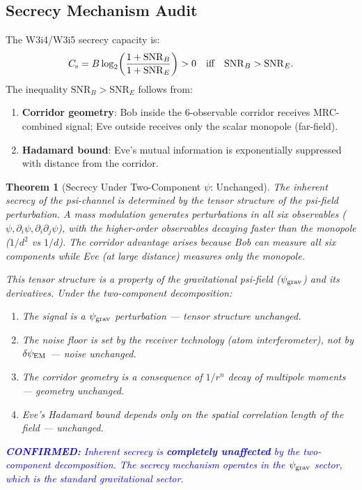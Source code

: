 \documentclass[11pt]{article}
\newtheorem{theorem}{Theorem}[section]
\theoremstyle{definition}
\theoremstyle{remark}
\newcommand{\psigrav}{\psi_{\rm grav}}
\newcommand{\dpsiEM}{\delta\psi_{\rm EM}}
\newcommand{\SNR}{\mathrm{SNR}}
\newcommand{\Cs}{C_{\rm s}}
\newcommand{\confirmed}[1]{\textcolor{blue}{\textbf{CONFIRMED:} #1}}
\begin{document}
\subsection{Secrecy Mechanism Audit}

The W3i4/W3i5 secrecy capacity is:
\begin{equation}
\Cs = B\log_2\!\left(\frac{1 + \SNR_B}{1 + \SNR_E}\right) > 0
\quad\text{iff}\quad \SNR_B > \SNR_E.
\label{eq:secrecy_capacity}
\end{equation}
The inequality $\SNR_B > \SNR_E$ follows from:
\begin{enumerate}
\item \textbf{Corridor geometry}: Bob inside the 6-observable corridor
  receives MRC-combined signal; Eve outside receives only the scalar
  monopole (far-field).
\item \textbf{Hadamard bound}: Eve's mutual information is exponentially
  suppressed with distance from the corridor.
\end{enumerate}

\begin{theorem}[Secrecy Under Two-Component $\psi$: Unchanged]
\label{thm:secrecy_unchanged}
The inherent secrecy of the psi-channel is determined by the
\emph{tensor structure} of the psi-field perturbation. A mass modulation
generates perturbations in all six observables
($\psi, \partial_i\psi, \partial_i\partial_j\psi$), with the
higher-order observables decaying faster than the monopole ($1/d^2$
vs $1/d$). The corridor advantage arises because Bob can measure all
six components while Eve (at large distance) measures only the monopole.

This tensor structure is a property of the \emph{gravitational}
psi-field ($\psigrav$) and its derivatives. Under the two-component
decomposition:
\begin{enumerate}[label=(\roman*)]
\item The signal is a $\psigrav$ perturbation --- tensor structure unchanged.
\item The noise floor is set by the receiver technology (atom
  interferometer), not by $\dpsiEM$ --- noise unchanged.
\item The corridor geometry is a consequence of $1/r^n$ decay of
  multipole moments --- geometry unchanged.
\item Eve's Hadamard bound depends only on the spatial correlation
  length of the field --- unchanged.
\end{enumerate}

\confirmed{Inherent secrecy is \textbf{completely unaffected} by the
two-component decomposition. The secrecy mechanism operates in the
$\psigrav$ sector, which is the standard gravitational sector.}
\end{theorem}
\end{document}
